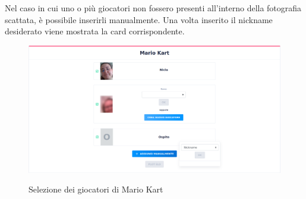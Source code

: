 		\noindent Nel caso in cui uno o più giocatori non fossero presenti all'interno della fotografia scattata, è possibile inserirli manualmente. Una volta inserito il nickname desiderato viene mostrata la card corrispondente.
		
		\begin{figure}[H]
			\centering
			\includegraphics[width=\textwidth]{immagini/kart-2.png} \\
			\caption{\label{fig:kart-2} Selezione dei giocatori di Mario Kart}
		\end{figure}
	
		
